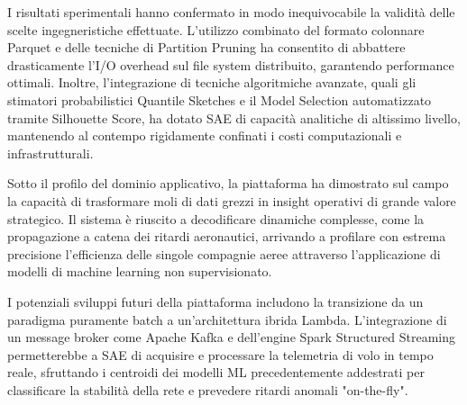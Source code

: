 \documentclass[conference]{IEEEtran}
\begin{document}
I risultati sperimentali hanno confermato in modo inequivocabile la validità delle scelte ingegneristiche effettuate.
L'utilizzo combinato del formato colonnare Parquet e delle tecniche di Partition Pruning ha consentito di abbattere drasticamente l'I/O overhead sul file system distribuito, garantendo performance ottimali.
Inoltre, l'integrazione di tecniche algoritmiche avanzate, quali gli stimatori probabilistici Quantile Sketches e il Model Selection automatizzato tramite Silhouette Score, ha dotato SAE di capacità analitiche di altissimo livello, mantenendo al contempo rigidamente confinati i costi computazionali e infrastrutturali.

Sotto il profilo del dominio applicativo, la piattaforma ha dimostrato sul campo la capacità di trasformare moli di dati grezzi in insight operativi di grande valore strategico.
Il sistema è riuscito a decodificare dinamiche complesse, come la propagazione a catena dei ritardi aeronautici, arrivando a profilare con estrema precisione l'efficienza delle singole compagnie aeree attraverso l'applicazione di modelli di machine learning non supervisionato.

I potenziali sviluppi futuri della piattaforma includono la transizione da un paradigma puramente batch a un'architettura ibrida Lambda.
L'integrazione di un message broker come Apache Kafka e dell'engine Spark Structured Streaming permetterebbe a SAE di acquisire e processare la telemetria di volo in tempo reale, sfruttando i centroidi dei modelli ML precedentemente addestrati per classificare la stabilità della rete e prevedere ritardi anomali "on-the-fly"\@.
\end{document}
